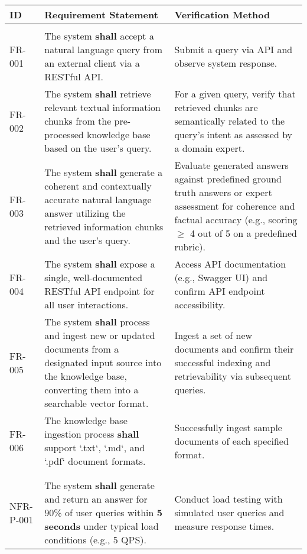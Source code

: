 \documentclass[a4paper,10pt]{article}
\begin{document}
\begin{longtable}{|>{\raggedright\arraybackslash}p{1.2cm}|>{\raggedright\arraybackslash}p{7cm}|>{\raggedright\arraybackslash}p{6.5cm}|}
\hline
\textbf{ID} & \textbf{Requirement Statement} & \textbf{Verification Method} \\
\hline
\endhead %

\multicolumn{3}{|l|}{\textbf{1. Functional Requirements (FR)}} \\
\hline
FR-001 & The system \textbf{shall} accept a natural language query from an external client via a RESTful API. & Submit a query via API and observe system response. \\
\hline
FR-002 & The system \textbf{shall} retrieve relevant textual information chunks from the pre-processed knowledge base based on the user's query. & For a given query, verify that retrieved chunks are semantically related to the query's intent as assessed by a domain expert. \\
\hline
FR-003 & The system \textbf{shall} generate a coherent and contextually accurate natural language answer utilizing the retrieved information chunks and the user's query. & Evaluate generated answers against predefined ground truth answers or expert assessment for coherence and factual accuracy (e.g., scoring $\ge$ 4 out of 5 on a predefined rubric). \\
\hline
FR-004 & The system \textbf{shall} expose a single, well-documented RESTful API endpoint for all user interactions. & Access API documentation (e.g., Swagger UI) and confirm API endpoint accessibility. \\
\hline
FR-005 & The system \textbf{shall} process and ingest new or updated documents from a designated input source into the knowledge base, converting them into a searchable vector format. & Ingest a set of new documents and confirm their successful indexing and retrievability via subsequent queries. \\
\hline
FR-006 & The knowledge base ingestion process \textbf{shall} support `.txt`, `.md`, and `.pdf` document formats. & Successfully ingest sample documents of each specified format. \\
\hline
\multicolumn{3}{|l|}{\textbf{2. Non-Functional Requirements (NFR)}} \\
\hline
\multicolumn{3}{|l|}{\textbf{2.1. Performance}} \\
\hline
NFR-P-001 & The system \textbf{shall} generate and return an answer for 90\% of user queries within \textbf{5 seconds} under typical load conditions (e.g., 5 QPS). & Conduct load testing with simulated user queries and measure response times. \\

\end{longtable}
\end{document}
